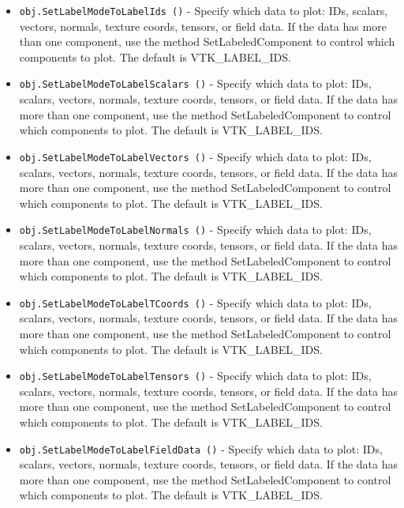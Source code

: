 \begin{itemize}
\item  \verb|obj.SetLabelModeToLabelIds ()| -  Specify which data to plot: IDs, scalars, vectors, normals, texture coords,
 tensors, or field data. If the data has more than one component, use
 the method SetLabeledComponent to control which components to plot.
 The default is VTK\_LABEL\_IDS.

\item  \verb|obj.SetLabelModeToLabelScalars ()| -  Specify which data to plot: IDs, scalars, vectors, normals, texture coords,
 tensors, or field data. If the data has more than one component, use
 the method SetLabeledComponent to control which components to plot.
 The default is VTK\_LABEL\_IDS.

\item  \verb|obj.SetLabelModeToLabelVectors ()| -  Specify which data to plot: IDs, scalars, vectors, normals, texture coords,
 tensors, or field data. If the data has more than one component, use
 the method SetLabeledComponent to control which components to plot.
 The default is VTK\_LABEL\_IDS.

\item  \verb|obj.SetLabelModeToLabelNormals ()| -  Specify which data to plot: IDs, scalars, vectors, normals, texture coords,
 tensors, or field data. If the data has more than one component, use
 the method SetLabeledComponent to control which components to plot.
 The default is VTK\_LABEL\_IDS.

\item  \verb|obj.SetLabelModeToLabelTCoords ()| -  Specify which data to plot: IDs, scalars, vectors, normals, texture coords,
 tensors, or field data. If the data has more than one component, use
 the method SetLabeledComponent to control which components to plot.
 The default is VTK\_LABEL\_IDS.

\item  \verb|obj.SetLabelModeToLabelTensors ()| -  Specify which data to plot: IDs, scalars, vectors, normals, texture coords,
 tensors, or field data. If the data has more than one component, use
 the method SetLabeledComponent to control which components to plot.
 The default is VTK\_LABEL\_IDS.

\item  \verb|obj.SetLabelModeToLabelFieldData ()| -  Specify which data to plot: IDs, scalars, vectors, normals, texture coords,
 tensors, or field data. If the data has more than one component, use
 the method SetLabeledComponent to control which components to plot.
 The default is VTK\_LABEL\_IDS.


\end{itemize}
